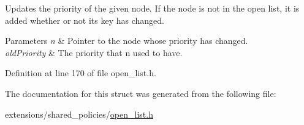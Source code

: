 Updates the priority of the given node. If the node is not in the open list, it is added whether or not it\textquotesingle{}s key has changed. 


\begin{DoxyParams}{Parameters}
{\em n} & Pointer to the node whose priority has changed. \\
\hline
{\em old\+Priority} & The priority that {\ttfamily n} used to have. \\
\hline
\end{DoxyParams}


Definition at line 170 of file open\+\_\+list.\+h.



The documentation for this struct was generated from the following file\+:\begin{DoxyCompactItemize}
\item 
extensions/shared\+\_\+policies/\hyperlink{open__list_8h}{open\+\_\+list.\+h}\end{DoxyCompactItemize}
